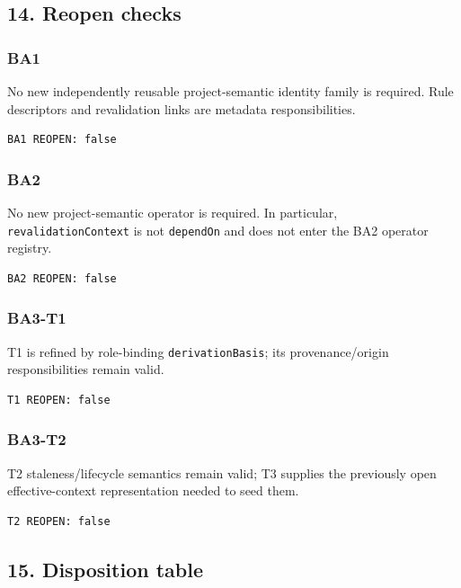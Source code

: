 \documentclass[11pt,a4paper]{article}
\begin{document}
\subsection{14. Reopen checks}\label{reopen-checks}

\subsubsection{BA1}\label{ba1}

No new independently reusable project-semantic identity family is
required. Rule descriptors and revalidation links are metadata
responsibilities.

\begin{verbatim}
BA1 REOPEN: false
\end{verbatim}

\subsubsection{BA2}\label{ba2}

No new project-semantic operator is required. In particular,
\texttt{revalidationContext} is not \texttt{dependOn} and does not enter
the BA2 operator registry.

\begin{verbatim}
BA2 REOPEN: false
\end{verbatim}

\subsubsection{BA3-T1}\label{ba3-t1}

T1 is refined by role-binding \texttt{derivationBasis}; its
provenance/origin responsibilities remain valid.

\begin{verbatim}
T1 REOPEN: false
\end{verbatim}

\subsubsection{BA3-T2}\label{ba3-t2}

T2 staleness/lifecycle semantics remain valid; T3 supplies the
previously open effective-context representation needed to seed them.

\begin{verbatim}
T2 REOPEN: false
\end{verbatim}

\subsection{15. Disposition table}\label{disposition-table}
\end{document}
